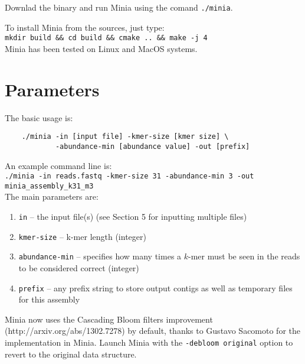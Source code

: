 \documentclass[a4paper]{article}
\begin{document}
Downlad the binary and run Minia using the comand \verb+./minia+.

To install Minia from the sources, just type: \\ \verb+mkdir build && cd build && cmake .. && make -j 4+ \\
Minia has been tested on Linux and MacOS systems.

\section{Parameters}

The basic usage is:\\

\begin{verbatim}
    ./minia -in [input file] -kmer-size [kmer size] \
            -abundance-min [abundance value] -out [prefix]
\end{verbatim}


An example command line is:\\


\verb+./minia -in reads.fastq -kmer-size 31 -abundance-min 3 -out minia_assembly_k31_m3+\\

The main parameters are:

\begin{enumerate}

    \item \verb+in+ -- the input file(s) (see Section 5 for inputting multiple files)

    \item \verb+kmer-size+  -- k-mer length (integer)

    \item \verb+abundance-min+ -- specifies how many times a $k$-mer must be seen in the reads to be considered correct (integer)

\item \verb+prefix+ -- any prefix string to store output contigs as well as temporary files for this assembly

\end{enumerate}

Minia now uses the Cascading Bloom filters improvement (http://arxiv.org/abs/1302.7278) by default, thanks to Gustavo Sacomoto for the implementation in Minia. Launch Minia with the \verb!-debloom original! option to revert to the original data structure.
\end{document}
